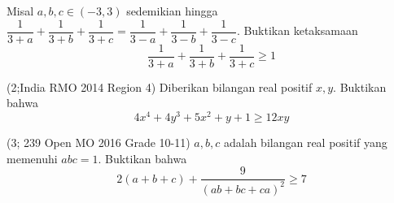 \documentclass[11pt]{scrartcl}
\begin{document}
\begin{problem}

Misal $a, b, c \in (-3,3)$ sedemikian hingga $\dfrac{1}{3 + a} + \dfrac{1}{3 + b} + \dfrac{1}{3 + c} = \dfrac{1}{3 - a} + \dfrac{1}{3 - b} + \dfrac{1}{3 - c}$. Buktikan ketaksamaan \[\dfrac{1}{3 + a} + \dfrac{1}{3 + b} + \dfrac{1}{3 + c} \geq 1 \]

\end{problem}

\begin{problem}

(2;India RMO 2014 Region 4) Diberikan bilangan real positif $x, y$. Buktikan bahwa \[4x^4 + 4y^3 + 5x^2 + y + 1 \geq 12xy\]

\end{problem}

\begin{problem}

(3; 239 Open MO 2016 Grade 10-11) $a, b, c$ adalah bilangan real positif yang memenuhi $abc = 1$. Buktikan bahwa \[2(a + b + c) + \dfrac{9}{(ab + bc + ca)^2} \geq 7\]

\end{problem}
\end{document}
